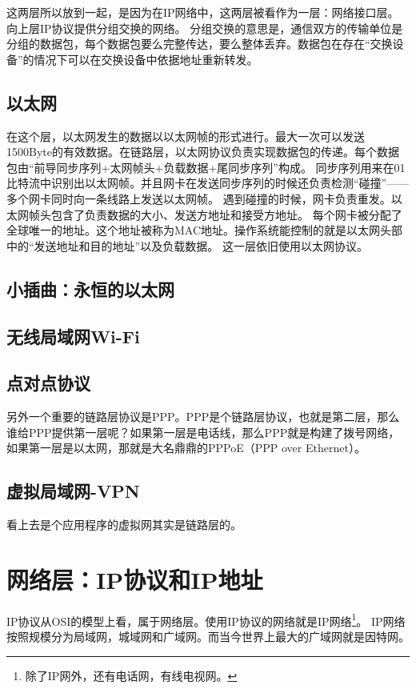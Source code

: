 这两层所以放到一起，是因为在IP网络中，这两层被看作为一层：网络接口层。向上层IP协议提供分组交换的网络。
分组交换的意思是，通信双方的传输单位是分组的数据包，每个数据包要么完整传达，要么整体丢弃。数据包在存在“交换设备”的情况下可以在交换设备中依据地址重新转发。

\subsection{以太网}

在这个层，以太网发生的数据以以太网帧的形式进行。最大一次可以发送 1500Byte的有效数据。在链路层，以太网协议负责实现数据包的传递。每个数据包由“前导同步序列+太网帧头+负载数据+尾同步序列”构成。
同步序列用来在01比特流中识别出以太网帧。并且网卡在发送同步序列的时候还负责检测“碰撞”——多个网卡同时向一条线路上发送以太网帧。
遇到碰撞的时候，网卡负责重发。以太网帧头包含了负责数据的大小、发送方地址和接受方地址。
每个网卡被分配了全球唯一的地址。这个地址被称为MAC地址。操作系统能控制的就是以太网头部中的“发送地址和目的地址”以及负载数据。
这一层依旧使用以太网协议。

\subsection*{小插曲：永恒的以太网}

\subsection{无线局域网Wi-Fi}

\subsection{点对点协议}

另外一个重要的链路层协议是PPP。PPP是个链路层协议，也就是第二层，那么谁给PPP提供第一层呢？如果第一层是电话线，那么PPP就是构建了拨号网络，如果第一层是以太网，那就是大名鼎鼎的PPPoE（PPP over Ethernet）。

\subsection{虚拟局域网-VPN}

看上去是个应用程序的虚拟网其实是链路层的。

\section{网络层：IP协议和IP地址}

IP协议从OSI的模型上看，属于网络层。使用IP协议的网络就是IP网络\footnote{除了IP网外，还有电话网，有线电视网。}。
IP网络按照规模分为局域网，城域网和广域网。而当今世界上最大的广域网就是因特网。

